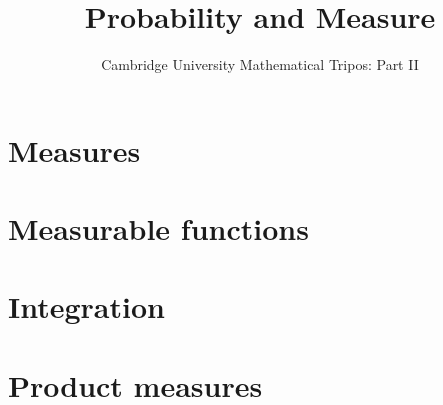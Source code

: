 \documentclass{article}
\title{Probability and Measure}
\author{Cambridge University Mathematical Tripos: Part II}
\begin{document}
\maketitle

\tableofcontentsnewpage{}

\section{Measures}

\section{Measurable functions}

\section{Integration}

\section{Product measures}

\end{document}
